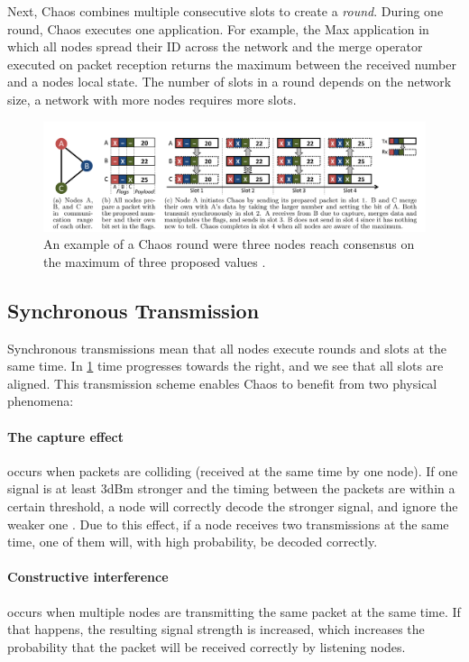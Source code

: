 Next, Chaos combines multiple consecutive slots to create a \textit{round}. During one round, Chaos executes one application. For example, the Max application in which all nodes spread their ID across the network and the merge operator executed on packet reception returns the maximum between the received number and a nodes local state. The number of slots in a round depends on the network size, a network with more nodes requires more slots.

\begin{figure}[bt]
    \centering
    \includegraphics[width=\textwidth]{figure/ChaosOverview.png}
    \caption{An example of a Chaos round were three nodes reach consensus on the maximum of three proposed values \cite{chaos-introduction-paper}.}
    \label{fig:chaos-overview}
\end{figure}

\subsection{Synchronous Transmission}
Synchronous transmissions mean that all nodes execute rounds and slots at the same time. In \cref{fig:chaos-overview} time progresses towards the right, and we see that all slots are aligned. This transmission scheme enables Chaos to benefit from two physical phenomena:

\paragraph*{The capture effect} occurs when packets are colliding (received at the same time by one node). If one signal is at least 3dBm stronger and the timing between the packets are within a certain threshold, a node will correctly decode the stronger signal, and ignore the weaker one \cite{Lee2007-capture-effect}. Due to this effect, if a node receives two transmissions at the same time, one of them will, with high probability, be decoded correctly.

\paragraph*{Constructive interference} occurs when multiple nodes are transmitting the same packet at the same time. If that happens, the resulting signal strength is increased, which increases the probability that the packet will be received correctly by listening nodes.

